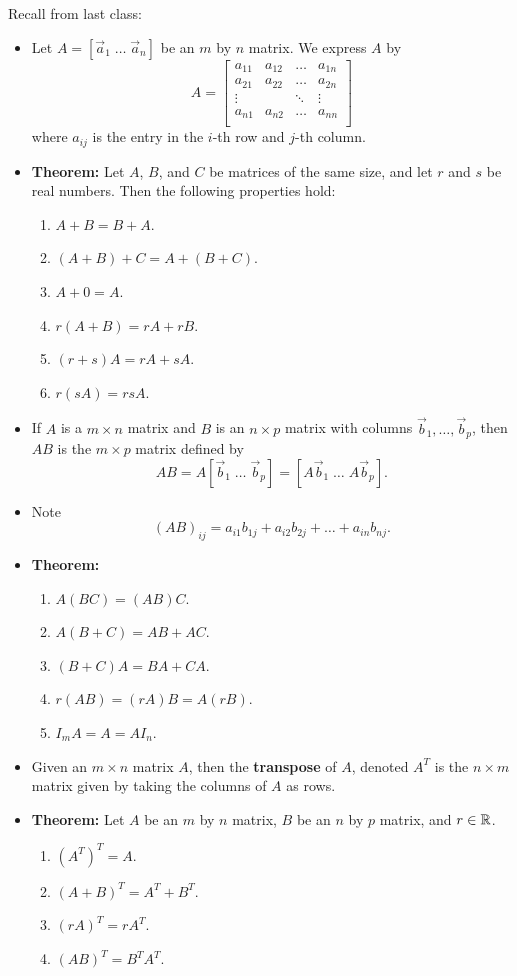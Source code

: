 \documentclass[12pt,letterpaper]{article}
\begin{document}
\thispagestyle{fancy}

Recall from last class:

\begin{itemize}

\item Let $A=[\vec{a}_1 \; \dots \; \vec{a}_n]$ be an $m$ by $n$ matrix. We express $A$ by
$$A=\begin{bmatrix}
a_{11} & a_{12} & \hdots & a_{1n}\\ 
a_{21} & a_{22} & \hdots & a_{2n}\\ 
\vdots & & \ddots & \vdots\\
a_{n1} & a_{n2} & \hdots & a_{nn}\\ 
\end{bmatrix}$$
where $a_{ij}$ is the entry in the $i$-th row and $j$-th column.
\item {\bf Theorem:} Let $A$, $B$, and $C$ be matrices of the same size, and let $r$ and $s$ be real numbers. Then the following properties hold:
\begin{enumerate}
\item $A+B=B+A$.
\item $(A+B)+C=A+(B+C)$.
\item $A+0=A$.
\item $r(A+B)=rA+rB$.
\item $(r+s)A=rA+sA$.
\item $r(sA)=rsA$.
\end{enumerate}
\item If $A$ is a $m\times n$ matrix and $B$ is an $n\times p$ matrix with columns $\vec{b}_1, \dots, \vec{b}_p$, then $AB$ is the $m \times p$ matrix defined by $$AB=A[\vec{b}_1 \; \dots \; \vec{b}_p]=[A\vec{b}_1 \; \dots \; A\vec{b}_p].$$
\item Note $$(AB)_{ij}=a_{i1}b_{1j}+a_{i2}b_{2j}+\dots+a_{in}b_{nj}.$$
\item {\bf Theorem:}
\begin{enumerate}
\item $A(BC)=(AB)C$.
\item $A(B+C)=AB+AC$.
\item $(B+C)A=BA+CA$.
\item $r(AB)=(rA)B=A(rB)$.
\item $I_m A =A = AI_n$.
\end{enumerate}
\item Given an $m\times n$ matrix $A$, then the {\bf transpose} of $A$, denoted $A^{T}$ is the $n \times m$ matrix given by taking the columns of $A$ as rows.
\item {\bf Theorem:} Let $A$ be an $m$ by $n$ matrix, $B$ be an $n$ by $p$ matrix, and $r\in \mathbb{R}$.
\begin{enumerate}
\item $(A^{T})^{T}=A.$
\item $(A+B)^{T}=A^{T}+B^{T}.$
\item $(rA)^{T}=r A^{T}$.
\item $(AB)^{T}=B^{T} A^{T}$.
\end{enumerate}
\end{itemize}
\end{document}
